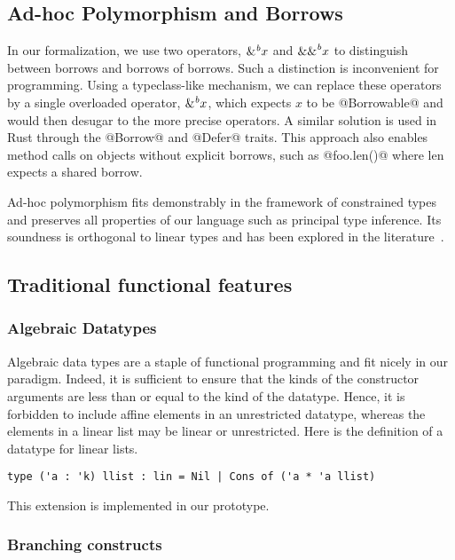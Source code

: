 \subsection{Ad-hoc Polymorphism and Borrows}

In our formalization, we use two operators, ${\&}^{\textit{b}}x$ and ${\&\&}^{\textit{b}}x$ to
distinguish between borrows and borrows of borrows.
Such a distinction is inconvenient for programming.
Using a typeclass-like mechanism, we can replace these operators
by a single overloaded operator, ${\&}^{\textit{b}}x$, which expects $x$ to be @Borrowable@ and
would then desugar to the more precise operators.
A similar solution is used in Rust through the @Borrow@ and @Defer@
traits.
This approach also enables method calls on objects without
explicit borrows, such as @foo.len()@ where len expects a shared borrow.

Ad-hoc polymorphism fits demonstrably in the \hmx framework of constrained
types and preserves all properties of our language such
as principal type inference. Its soundness is orthogonal to linear types
and has been explored in the literature~\citep{DBLP:conf/fpca/OderskyWW95}.

\subsection{Traditional functional features}

\subsubsection{Algebraic Datatypes}

Algebraic data types are a staple of functional programming and fit nicely
in our paradigm. Indeed, it is sufficient to ensure  that the kinds of
the constructor arguments are less than or equal to the kind of the datatype.
Hence, it is forbidden to include affine elements in an unrestricted
datatype, whereas the elements in a linear list may be linear or
unrestricted. 
Here is the definition of a datatype for linear lists.

\begin{lstlisting}
type ('a : 'k) llist : lin = Nil | Cons of ('a * 'a llist)
\end{lstlisting}

This extension is implemented in our prototype.

\subsubsection{Branching constructs}

